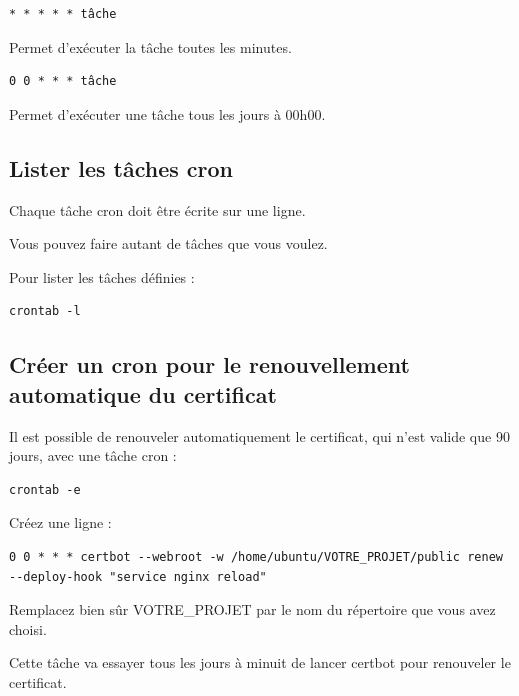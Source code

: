 \documentclass{article}
\begin{document}
\begin{verbatim}
* * * * * tâche
\end{verbatim}

Permet d'exécuter la tâche toutes les minutes.
\begin{verbatim}
0 0 * * * tâche
\end{verbatim}

Permet d'exécuter une tâche tous les jours à 00h00.

\subsection{Lister les tâches cron}
Chaque tâche cron doit être écrite sur une ligne.

Vous pouvez faire autant de tâches que vous voulez.

Pour lister les tâches définies :
\begin{verbatim}
crontab -l
\end{verbatim}

\subsection{Créer un cron pour le renouvellement automatique du certificat}
Il est possible de renouveler automatiquement le certificat, qui n'est valide que 90 jours, avec une tâche cron :
\begin{verbatim}
crontab -e
\end{verbatim}

Créez une ligne :
\begin{verbatim}
0 0 * * * certbot --webroot -w /home/ubuntu/VOTRE_PROJET/public renew --deploy-hook "service nginx reload"
\end{verbatim}

Remplacez bien sûr VOTRE\_PROJET par le nom du répertoire que vous avez choisi.

Cette tâche va essayer tous les jours à minuit de lancer certbot pour renouveler le certificat.
\end{document}
